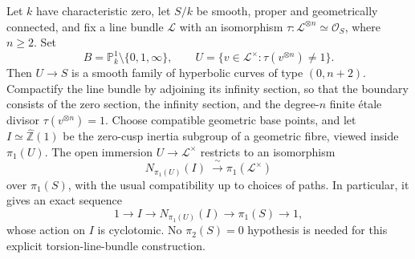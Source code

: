 \begin{proposition}
Let $k$ have characteristic zero, let $S/k$ be smooth, proper and
geometrically connected, and fix a line bundle $\mathcal L$ with
an isomorphism $\tau:\mathcal L^{\otimes n}\simeq\mathcal O_S$,
where $n\ge2$. Set
\[
 B=\mathbb P^1_k\setminus\{0,1,\infty\},\qquad
 U=\{v\in\mathcal L^\times:\tau(v^{\otimes n})\ne1\}.
\]
Then $U\to S$ is a smooth family of hyperbolic curves of type
$(0,n+2)$. Compactify the line bundle by adjoining its infinity
section, so that the boundary consists of the zero section, the
infinity section, and the degree-$n$ finite \'etale divisor
$\tau(v^{\otimes n})=1$. Choose compatible geometric base points,
and let $I\simeq\widehat{\mathbb Z}(1)$ be the zero-cusp inertia
subgroup of a geometric fibre, viewed inside $\pi_1(U)$.
The open immersion $U\to\mathcal L^\times$ restricts to an
isomorphism
\begin{equation}\label{eq:ag-cusp-normalizer}
 N_{\pi_1(U)}(I)\ \xrightarrow{\ \sim\ }
 \pi_1(\mathcal L^\times)
\end{equation}
over $\pi_1(S)$, with the usual compatibility up to choices of
paths. In particular, it gives an exact sequence
\[
 1\longrightarrow I\longrightarrow N_{\pi_1(U)}(I)
 \longrightarrow\pi_1(S)\longrightarrow1,
\]
whose action on $I$ is cyclotomic. No $\pi_2(S)=0$ hypothesis is
needed for this explicit torsion-line-bundle construction.
\end{proposition}
